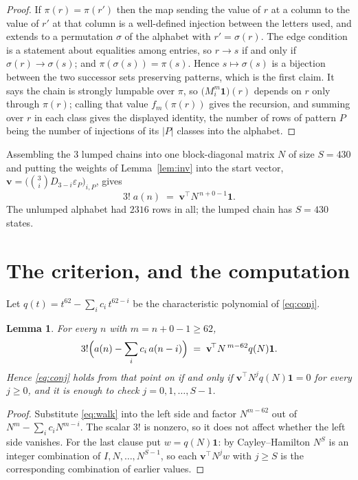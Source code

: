 \documentclass[11pt,a4paper]{article}
\theoremstyle{plain}
\newtheorem{lemma}[theorem]{Lemma}
\theoremstyle{definition}
\begin{document}
\begin{proof}
If $\pi(r)=\pi(r')$ then the map sending the value of $r$ at a column to the value of $r'$
at that column is a well-defined injection between the letters used, and extends to a
permutation $\sigma$ of the alphabet with $r'=\sigma(r)$. The edge condition is a statement
about equalities among entries, so $r\to s$ if and only if $\sigma(r)\to\sigma(s)$; and
$\pi(\sigma(s))=\pi(s)$. Hence $s\mapsto\sigma(s)$ is a bijection between the two successor
sets preserving patterns, which is the first claim. It says the chain is strongly lumpable
over $\pi$, so $\bigl(M_i^{m}\mathbf{1}\bigr)(r)$ depends on $r$ only through $\pi(r)$;
calling that value $f_m(\pi(r))$ gives the recursion, and summing over $r$ in each class
gives the displayed identity, the number of rows of pattern $P$ being the number of
injections of its $|P|$ classes into the alphabet.
\end{proof}

Assembling the $3$ lumped chains into one block-diagonal matrix $N$ of size $S=430$ and
putting the weights of Lemma~\ref{lem:inv} into the start vector,
$\mathbf{v}=\bigl(\binom{3}{i}D_{3-i}\varepsilon_P\bigr)_{i,P}$, gives
\begin{equation}\label{eq:walk}
3!\;a(n)\;=\;\mathbf{v}^{\!\top}N^{\,n+0-1}\mathbf{1} .
\end{equation}
The unlumped alphabet had $2316$ rows in all; the lumped chain has $S=430$ states.

\section{The criterion, and the computation}

Let $q(t)=t^{62}-\sum_i c_i\,t^{62-i}$ be the characteristic polynomial of
\eqref{eq:conj}.

\begin{lemma}\label{lem:crit}
For every $n$ with $m=n+0-1\ge62$,
\[
3!\Bigl(a(n)-\sum_i c_i\,a(n-i)\Bigr)\;=\;\mathbf{v}^{\!\top}N^{\,m-62}q(N)\mathbf{1} .
\]
Hence \eqref{eq:conj} holds from that point on if and only if
$\mathbf{v}^{\!\top}N^{j}q(N)\mathbf{1}=0$ for every $j\ge0$, and it is enough to check
$j=0,1,\dots,S-1$.
\end{lemma}

\begin{proof}
Substitute \eqref{eq:walk} into the left side and factor $N^{m-62}$ out of
$N^{m}-\sum_i c_iN^{m-i}$. The scalar $3!$ is nonzero, so it does not affect whether
the left side vanishes. For the last clause put $w=q(N)\mathbf{1}$: by Cayley--Hamilton
$N^{S}$ is an integer combination of $I,N,\dots,N^{S-1}$, so each
$\mathbf{v}^{\!\top}N^{j}w$ with $j\ge S$ is the corresponding combination of earlier
values.
\end{proof}
\end{document}
